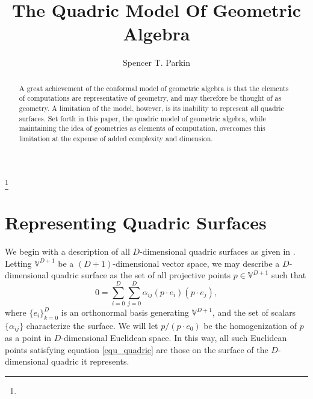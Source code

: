 \documentclass{ecgd-l}
\theoremstyle{definition}
\theoremstyle{remark}
\numberwithin{equation}{section}
\newcommand{\V}{\mathbb{V}}
\begin{document}
\title{The Quadric Model Of Geometric Algebra}


\author{Spencer T. Parkin}
\address{}
\curraddr{}
\thanks{}



\date{}

\dedicatory{}

\begin{abstract}
A great achievement of the conformal model of geometric algebra is that the elements
of computations are representative of geometry, and may therefore be thought of as geometry.
A limitation of the model, however, is its inability to represent all quadric surfaces.
Set forth in this paper, the quadric model of geometric algebra, while maintaining the idea
of geometries as elements of computation, overcomes this limitation at the expense of
added complexity and dimension.
\end{abstract}

\maketitle


\nocite{DoranHestenes93}
\nocite{WikipediaQuadricEntry}

\section{Representing Quadric Surfaces}

We begin with a description of all $D$-dimensional quadric surfaces as
given in \cite{WikipediaQuadricEntry}.  Letting $\V^{D+1}$ be a
$(D+1)$-dimensional vector space, we may describe a $D$-dimensional
quadric surface as the set of all projective points $p\in\V^{D+1}$
such that
\begin{equation}\label{equ_quadric}
0 = \sum_{i=0}^{D}\sum_{j=0}^{D}\alpha_{ij}(p\cdot e_i)(p\cdot e_j),
\end{equation}
where $\{e_i\}_{k=0}^{D}$ is an orthonormal basis generating $\V^{D+1}$,
and the set of scalars $\{\alpha_{ij}\}$ characterize the surface.
We will let $p/(p\cdot e_0)$ be the homogenization of $p$ as a point in $D$-dimensional
Euclidean space.  In this way, all such Euclidean points satisfying equation \eqref{equ_quadric}
are those on the surface of the $D$-dimensional quadric it represents.
\end{document}
